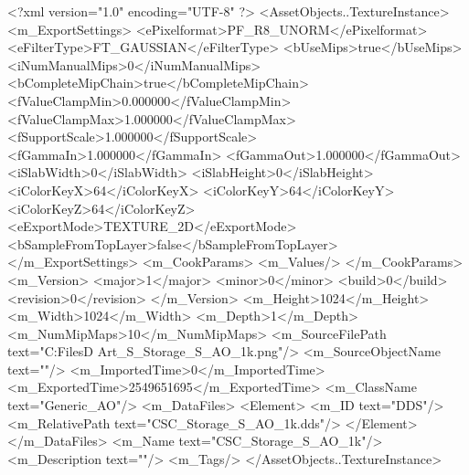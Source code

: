 <?xml version="1.0" encoding="UTF-8" ?>
<AssetObjects..TextureInstance>
	<m_ExportSettings>
		<ePixelformat>PF_R8_UNORM</ePixelformat>
		<eFilterType>FT_GAUSSIAN</eFilterType>
		<bUseMips>true</bUseMips>
		<iNumManualMips>0</iNumManualMips>
		<bCompleteMipChain>true</bCompleteMipChain>
		<fValueClampMin>0.000000</fValueClampMin>
		<fValueClampMax>1.000000</fValueClampMax>
		<fSupportScale>1.000000</fSupportScale>
		<fGammaIn>1.000000</fGammaIn>
		<fGammaOut>1.000000</fGammaOut>
		<iSlabWidth>0</iSlabWidth>
		<iSlabHeight>0</iSlabHeight>
		<iColorKeyX>64</iColorKeyX>
		<iColorKeyY>64</iColorKeyY>
		<iColorKeyZ>64</iColorKeyZ>
		<eExportMode>TEXTURE_2D</eExportMode>
		<bSampleFromTopLayer>false</bSampleFromTopLayer>
	</m_ExportSettings>
	<m_CookParams>
		<m_Values/>
	</m_CookParams>
	<m_Version>
		<major>1</major>
		<minor>0</minor>
		<build>0</build>
		<revision>0</revision>
	</m_Version>
	<m_Height>1024</m_Height>
	<m_Width>1024</m_Width>
	<m_Depth>1</m_Depth>
	<m_NumMipMaps>10</m_NumMipMaps>
	<m_SourceFilePath text="C:\Users\Shadow\Desktop\Working Files\3D Art\Storage_S\CSC_Storage_S_AO_1k.png"/>
	<m_SourceObjectName text=""/>
	<m_ImportedTime>0</m_ImportedTime>
	<m_ExportedTime>2549651695</m_ExportedTime>
	<m_ClassName text="Generic_AO"/>
	<m_DataFiles>
		<Element>
			<m_ID text="DDS"/>
			<m_RelativePath text="CSC_Storage_S_AO_1k.dds"/>
		</Element>
	</m_DataFiles>
	<m_Name text="CSC_Storage_S_AO_1k"/>
	<m_Description text=""/>
	<m_Tags/>
</AssetObjects..TextureInstance>

